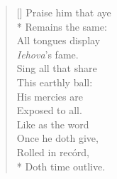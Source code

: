 \documentclass[MAIN]{subfiles}
\begin{document}
\settowidth{\versewidth}{Praise him that aye}
\begin{verse}[\versewidth]
Praise him that aye\\*
Remains the same:\\
All tongues display\\
\emph{Iehova}'s fame.\\
Sing all that share\\
This earthly ball:\\
His mercies are\\
Exposed to all.\\
Like as the word\\
Once he doth give,\\
Rolled in rec\'ord,\\*
Doth time outlive.
\end{verse}
\end{document}
